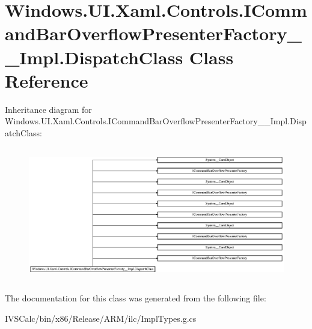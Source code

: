 \hypertarget{class_windows_1_1_u_i_1_1_xaml_1_1_controls_1_1_i_command_bar_overflow_presenter_factory_____impl_1_1_dispatch_class}{}\section{Windows.\+U\+I.\+Xaml.\+Controls.\+I\+Command\+Bar\+Overflow\+Presenter\+Factory\+\_\+\+\_\+\+Impl.\+Dispatch\+Class Class Reference}
\label{class_windows_1_1_u_i_1_1_xaml_1_1_controls_1_1_i_command_bar_overflow_presenter_factory_____impl_1_1_dispatch_class}
Inheritance diagram for Windows.\+U\+I.\+Xaml.\+Controls.\+I\+Command\+Bar\+Overflow\+Presenter\+Factory\+\_\+\+\_\+\+Impl.\+Dispatch\+Class\+:\begin{figure}[H]
\begin{center}
\leavevmode
\includegraphics[height=5.911708cm]{class_windows_1_1_u_i_1_1_xaml_1_1_controls_1_1_i_command_bar_overflow_presenter_factory_____impl_1_1_dispatch_class}
\end{center}
\end{figure}


The documentation for this class was generated from the following file\+:\begin{DoxyCompactItemize}
\item 
I\+V\+S\+Calc/bin/x86/\+Release/\+A\+R\+M/ilc/Impl\+Types.\+g.\+cs\end{DoxyCompactItemize}
